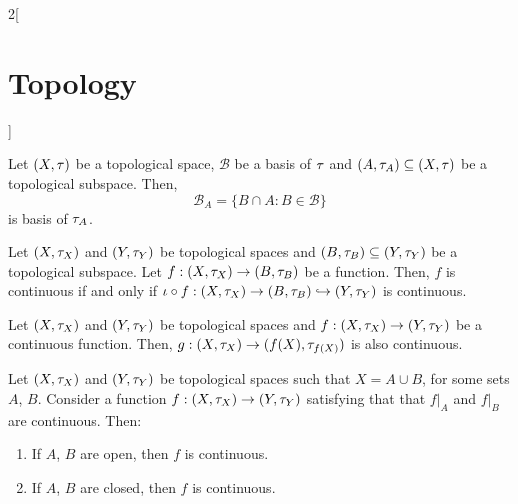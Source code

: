 \documentclass[../../../main.tex]{subfiles}
\begin{document}
\begin{multicols}{2}[\section{Topology}]
  \begin{prop}
    Let $(X,\tau)$ be a topological space, $\mathcal{B}$ be a basis of $\tau$ and $(A,\tau_A)\subseteq (X,\tau)$ be a topological subspace. Then, $$\mathcal{B}_A=\{B\cap A:B\in\mathcal{B}\}$$ is basis of $\tau_A$.
  \end{prop}
  \begin{prop}
    Let $(X,\tau_X)$ and $(Y,\tau_Y)$ be topological spaces and $(B,\tau_B)\subseteq (Y,\tau_Y)$ be a topological subspace. Let $f:(X,\tau_X)\rightarrow (B,\tau_B)$ be a function. Then, $f$ is continuous if and only if $\iota\circ f:(X,\tau_X)\rightarrow (B,\tau_B)\hookrightarrow (Y,\tau_Y)$ is continuous.
  \end{prop}
  \begin{corollary}
    Let $(X,\tau_X)$ and $(Y,\tau_Y)$ be topological spaces and $f:(X,\tau_X)\rightarrow (Y,\tau_Y)$ be a continuous function. Then, $g:(X,\tau_X)\rightarrow (f(X),\tau_{f(X)})$ is also continuous.
  \end{corollary}
  \begin{prop}
    Let $(X,\tau_X)$ and $(Y,\tau_Y)$ be topological spaces such that $X=A\cup B$, for some sets $A$, $B$. Consider a function $f:(X,\tau_X)\rightarrow (Y,\tau_Y)$ satisfying that that $f|_A$ and $f|_B$ are continuous. Then:
    \begin{enumerate}
      \item If $A$, $B$ are open, then $f$ is continuous.
      \item If $A$, $B$ are closed, then $f$ is continuous.
    \end{enumerate}
  \end{prop}

\end{multicols}
\end{document}
